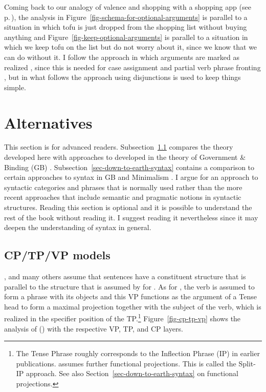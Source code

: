 Coming back to our analogy of valence and shopping with a shopping app (see p.\,\pageref{page-shopping-analogy}), the
analysis in Figure~\ref{fig-schema-for-optional-arguments} is parallel to a situation in which tofu
is just dropped from the shopping list without buying anything and Figure~\ref{fig-keep-optional-arguments} is parallel to a
situation in which we keep tofu on the list but do not worry about it, since we know that we can do
without it. I follow the approach in which arguments are marked as realized \parencites[465]{MG2010a}[Chapter~16.4]{MuellerLehrbuch4}, since this is needed
for case assignment and partial verb phrase fronting \citep{Meurers99b}, but in what follows the
approach using disjunctions is used to keep things simple.






\section{Alternatives}

This section is for advanced readers. Subsection~\ref{sec-cp-tp-vp} compares the theory developed here with approaches to
 developed in the theory of Government \& Binding (GB)
\citep{Chomsky81a,Chomsky86b}. Subsection~\ref{sec-down-to-earth-syntax} contains a comparison to
certain approaches to syntax in GB and Minimalism \citep{Chomsky95a-u}. I argue for an approach to
syntactic categories and phrases that is normally used rather than the more recent approaches that
include semantic and pragmatic notions in syntactic structures. Reading this section is optional and it is
possible to understand the rest of the book without reading it. I suggest reading it nevertheless
since it may deepen the understanding of syntax in general.



\subsection{CP/TP/VP models}
\label{sec-cp-tp-vp}\label{sec-cp-tp-vp-scrambling}
\label{sec-discussion-scope}

\largerpage
\citet{Grewendorf88a,Grewendorf93}, \citet{Lohnstein2014a} and many others assume that 
sentences have a constituent structure that is parallel to the structure that is assumed by
\citet{Chomsky86b} for . As for , the verb is
assumed to form a phrase with its objects and this VP functions as the argument of a Tense head to
form a maximal projection together with the subject of the verb, which is realized in the specifier
position of the TP.\footnote{
The Tense Phrase roughly corresponds to the Inflection Phrase (IP) in earlier
publications. \citet[]{Pollock89a-u} assumes further functional projections. This is called the
Split-IP approach. See also Section~\ref{sec-down-to-earth-syntax} on functional projections.
} Figure~\ref{fig-cp-tp-vp} shows the analysis of () with the respective
VP, TP, and CP layers.

